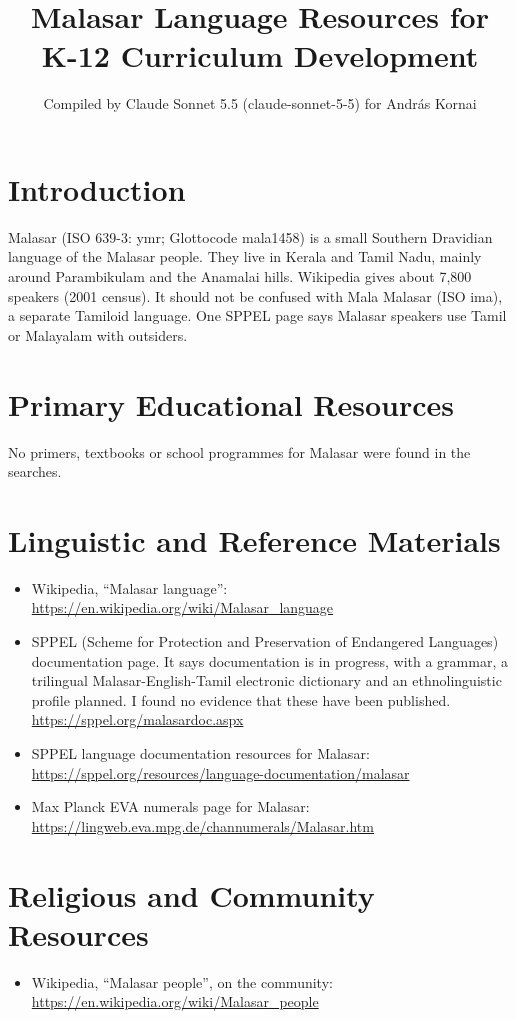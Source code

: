 \documentclass[12pt]{article}
\title{Malasar Language Resources for K-12 Curriculum Development}
\author{Compiled by Claude Sonnet 5.5 (claude-sonnet-5-5) for Andr\'as Kornai}
\date{}
\begin{document}
\maketitle

\section{Introduction}
Malasar (ISO 639-3: ymr; Glottocode mala1458) is a small Southern Dravidian language of the Malasar people. They live in Kerala and Tamil Nadu, mainly around Parambikulam and the Anamalai hills. Wikipedia gives about 7,800 speakers (2001 census). It should not be confused with Mala Malasar (ISO ima), a separate Tamiloid language. One SPPEL page says Malasar speakers use Tamil or Malayalam with outsiders.

\section{Primary Educational Resources}
No primers, textbooks or school programmes for Malasar were found in the searches.

\section{Linguistic and Reference Materials}
\begin{itemize}
\item Wikipedia, ``Malasar language'': \url{https://en.wikipedia.org/wiki/Malasar_language}
\item SPPEL (Scheme for Protection and Preservation of Endangered Languages) documentation page. It says documentation is in progress, with a grammar, a trilingual Malasar-English-Tamil electronic dictionary and an ethnolinguistic profile planned. I found no evidence that these have been published. \url{https://sppel.org/malasardoc.aspx}
\item SPPEL language documentation resources for Malasar: \url{https://sppel.org/resources/language-documentation/malasar}
\item Max Planck EVA numerals page for Malasar: \url{https://lingweb.eva.mpg.de/channumerals/Malasar.htm}
\end{itemize}

\section{Religious and Community Resources}
\begin{itemize}
\item Wikipedia, ``Malasar people'', on the community: \url{https://en.wikipedia.org/wiki/Malasar_people}
\end{itemize}
\end{document}
